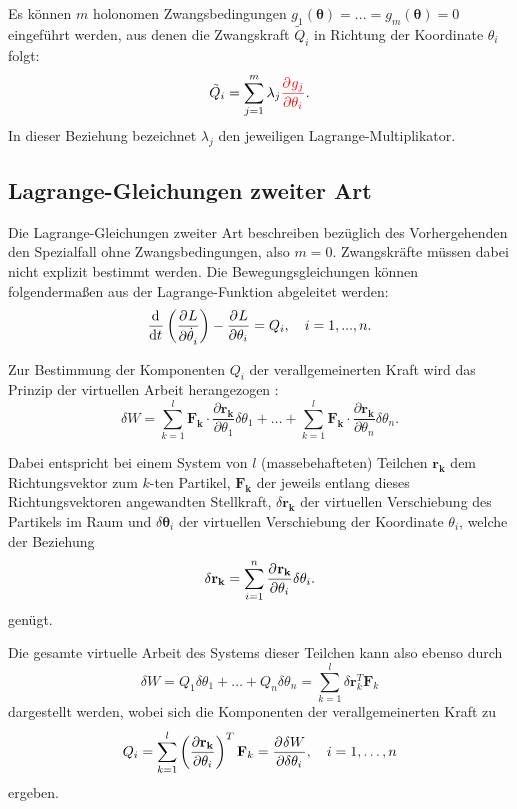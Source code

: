 Es können $m$ holonomen Zwangsbedingungen $g_1(\boldsymbol{\theta}) = ... = g_m(\boldsymbol{\theta}) = 0$ eingeführt werden, aus denen die Zwangskraft $\tilde{Q}_i$ in Richtung der Koordinate $\theta_i$ folgt:
\begin{equation}
	\tilde{Q}_i = \sum_{j = 1}^m \lambda_j \textcolor{red}{\frac{\partial^{}g_j}{\partial{\theta_i}^{}}}.
\end{equation}
In dieser Beziehung bezeichnet $\lambda_j$ den jeweiligen Lagrange-Multiplikator.

\subsection{Lagrange-Gleichungen zweiter Art}
\label{sec:Lagrange2_theory}
Die Lagrange-Gleichungen zweiter Art beschreiben bezüglich des Vorhergehenden den Spezialfall ohne Zwangsbedingungen, also $m = 0$. Zwangskräfte müssen dabei nicht explizit bestimmt werden. Die Bewegungsgleichungen können folgendermaßen aus der Lagrange-Funktion abgeleitet werden:
\begin{equation}
	\frac{\mathrm{d}^{}}{\mathrm{d}{t}^{}}\left(\frac{\partial^{}L}{\partial{\dot{\theta}_i}^{}} \right) - \frac{\partial^{}L}{\partial{\theta_i}^{}} = Q_i, \quad i = 1, ..., n.
\end{equation} 

Zur Bestimmung der Komponenten $Q_i$ der verallgemeinerten Kraft wird das Prinzip der virtuellen Arbeit herangezogen \cite{VirtualWork}:
\begin{equation}
	\delta W = \sum_{k=1}^l \mathbf{F_k} \cdot \frac{\partial \mathbf{r_k}}{\partial \theta_1} \delta \theta_1 +\ldots + \sum_{k=1}^l \mathbf{F_k} \cdot \frac{\partial \mathbf{r_k}}{\partial \theta_n} \delta \theta_n.
\end{equation}

Dabei entspricht bei einem System von $l$ (massebehafteten) Teilchen $\mathbf{r_k}$ dem Richtungsvektor zum $k$-ten Partikel, $\mathbf{F_k}$ der jeweils entlang dieses Richtungsvektoren angewandten Stellkraft, $\delta \mathbf{r_{k}}$ der virtuellen Verschiebung des Partikels im Raum und $\delta \boldsymbol{\theta}_{i}$ der virtuellen Verschiebung der Koordinate $\theta_i$, welche der Beziehung
\begin{equation}
	\delta \mathbf{r_{k}} = \sum_{i = 1}^{n} \frac{\partial^{}\mathbf{r_{k}}}{\partial{\theta_i}^{}} \delta \theta_i.
\end{equation}
genügt.

Die gesamte virtuelle Arbeit des Systems dieser Teilchen kann also ebenso durch
\begin{equation}
\label{eq:virtual_work}
\delta W = Q_1 \delta \theta_1 + \ldots + Q_n\delta \theta_n = \sum_{k=1}^{l}\delta \mathbf{r}_k^T \mathbf{F}_k
\end{equation}
dargestellt werden, wobei sich die Komponenten der verallgemeinerten Kraft zu
\begin{equation}
\label{eq:virtual_work_force}
Q_i = \sum_{k=1}^l \left(\frac {\partial \mathbf{r_k}} {\partial \theta_i} \right)^T \mathbf {F}_{k} = \frac{\partial^{}\delta W}{\partial{\delta \theta_i}^{}} ,\quad i=1,\ldots, n 
\end{equation}
ergeben.
